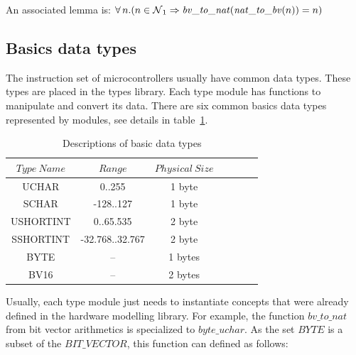 \documentclass[11pt]{article} %
\begin{document}
An  associated lemma is: $\forall n . (n \in \nat_1 \implies \mathit{bv\_to\_nat}(\mathit{nat\_to\_bv}(n)) = n)$

\subsection{Basics data types}

The instruction set of microcontrollers usually have common data types. These types are placed in the
types library. Each type module has functions to manipulate and convert its data. There are six common
basics data types represented by modules, see details in table~\ref{tab:types}.


\begin{table}
\caption{Descriptions of basic data types}
\label{tab:types}


\begin{center}
\begin{tabular}{|c|c|c|c|c|c|c|}
\hline
 $Type\ Name$ & $Range$ & $Physical\ Size $\\\hline
 UCHAR & 0..255 & 1 byte\\\hline
 SCHAR & -128..127 & 1 byte  \\\hline
 USHORTINT & 0..65.535 & 2 byte \\\hline
 SSHORTINT & -32.768..32.767 & 2 byte \\\hline
 BYTE & -- & 1 bytes  \\\hline
 BV16 & -- & 2 bytes \\ \hline
\end{tabular}
\end{center}


\end{table}




Usually, each type module just needs to instantiate concepts that were already defined in the hardware
modelling library.  For example, the function $\mathit{bv\_to\_nat}$ from bit vector arithmetics is
specialized to $\mathit{byte\_uchar}$. As the set $\mathit{BYTE}$ is a subset of the
$\mathit{BIT\_VECTOR}$, this function can defined as follows:
\end{document}
